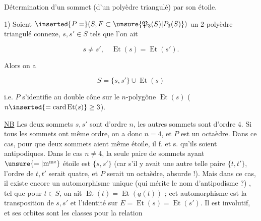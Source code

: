 

Détermination d'un sommet (d'un polyèdre triangulé) par son étoile.

1) Soient $\inserted{P=}(S,F\subset\unsure{\mathfrak P_3(S)|P_3(S)})$ un 2-polyèdre triangulé connexe, $s,s'\in S$ tels que  l'on ait

\[
s\ne s',\quad\operatorname{Et}(s)=\operatorname{Et}(s').
\]

Alors on a

\[
S=\{s,s'\}\cup\operatorname{Et}(s)
\]

i.e. $P$ s'identifie au double cône sur le $n$-polygône $\operatorname{Et}(s)$ ($n\inserted{=\operatorname{card}\operatorname{Et}(s)}\geq3$).


\uline{NB} Les deux sommets $s,s'$ sont d'ordre $n$, les autres sommets sont d'ordre 4. Si tous les sommets ont même ordre, on a donc $n=4$, et $P$ est un octaèdre. Dans ce cas, pour que deux sommets aient même étoile, il f. et s. qu'ils soient antipodiques. Dans le cas $n\ne4$, la seule paire de sommets ayant $\unsure{=|\text{m\textsuperscript{me}}}$ étoile est $\{s,s'\}$ (car  s'il y avait une autre  telle paire $\{t,t'\}$,  l'ordre de $t,t'$ serait quatre, et $P$ serait un octaèdre, absurde !). Mais dans ce cas, il existe encore un automorphisme unique (qui mérite le nom d'antipodisme ?) , tel que pour  $t\in S$, on ait $\operatorname{Et}(t)=\operatorname{Et}(\underline a(t))$ ; cet automorphisme est la transposition de $s,s'$ et l'identité sur $E=\operatorname{Et}(s)=\operatorname{Et}(s')$. Il est involutif, et ses orbites sont les classes pour la relation
